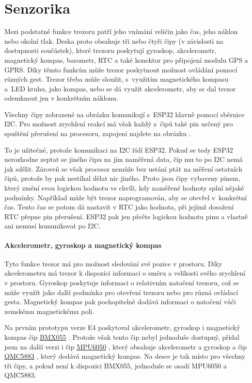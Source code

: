 \section{Senzorika}
Mezi podstatné funkce trezoru patří jeho vnímání veličin jako čas, jeho náklon nebo okolní tlak.
Deska proto obsahuje tři nebo čtyři čipy (v závislosti na dostupnosti součástek), které trezoru poskytují gyroskop, akcelerometr, magnetický kompas,
barometr, RTC a také konektor pro připojení modulu GPS a GPRS. Díky těmto funkcím může trezor poskytnout možnost ovládání 
pomocí různých gest. 
Trezor třeba může sloužit, s~využitím magnetického kompasu a~LED kruhu, jako kompas, nebo se dá využít akcelerometr, 
aby se dal trezor odemknout jen v konkrétním náklonu. 

Všechny čipy zobrazené na obrázku  komunikují s~ESP32 hlavně pomocí 
sběrnice I2C. Pro možnost zrychlení reakcí má však každý z~čipů také pin určený pro spuštění přerušení na procesoru, zapojení najdete na obrázku . 

To je užitečné, protože komunikaci na I2C řídí ESP32. Pokud se tedy ESP32 nerozhodne zeptat se jiného čipu na jím naměřená data, čip mu to po I2C nemá 
jak sdělit. Zároveň se však procesor nemůže bez ustání ptát na měření ostatních čipů, protože by pak nestíhal dělat nic jiného. Proto jsou čipy vybaveny 
pinem, který změní svou logickou hodnotu ve chvíli, kdy naměřené hodnoty splní nějaké podmínky. 
Například může být trezor naprogramován, aby se otevřel 
v~konkrétní čas. Tento čas se potom dá nastavit v RTC jako hodnota, při jejímž dosažení RTC přepne pin přerušení. ESP32 pak jen přečte logickou hodnotu 
pinu a vlastně ani nemusí komunikovat po I2C.

\paragraph{Akcelerometr, gyroskop a magnetický kompas}
Tyto funkce trezor má pro možnost sledování své pozice v prostoru. 
Díky akcelerometru má trezor k dispozici informaci o směru a velikosti svého zrychlení v prostoru.
Gyroskop poskytuje informaci o relativním natočení trezoru, což se může využít jako další podmínka pro otevření trezoru nebo pro různá ovládací gesta.
Magnetický kompas pak pochopitelně dodává informaci o natočení vůči zemskému magnetickému poli.

Na prvním prototypu verze E4 poskytoval akcelerometr, gyroskop i magnetický kompas čip \href{https://datasheet.lcsc.com/szlcsc/Bosch-Sensortec-BMX055_C94022.pdf}{BMX055} \parencite{bmx055}.
Protože však tento čip nebyl jednoduše dostupný, přidal jsem na další verzi i čip \href{https://datasheet.lcsc.com/szlcsc/TDK-InvenSense-MPU-6050_C24112.pdf}{MPU6050} \parencite{mpu6050},
který obsahuje akcelerometr a gyroskop a čip \href{https://datasheet.lcsc.com/szlcsc/QST-QMC5883L-TR_C192585.pdf}{QMC5883} \parencite{qmc5883}, který dodává magnetický kompas.
Na desce je tak místo pro všechny tři čipy, a pokud není k dispozici BMX055, jednoduše se osadí MPU6050 a QMC5883. 

